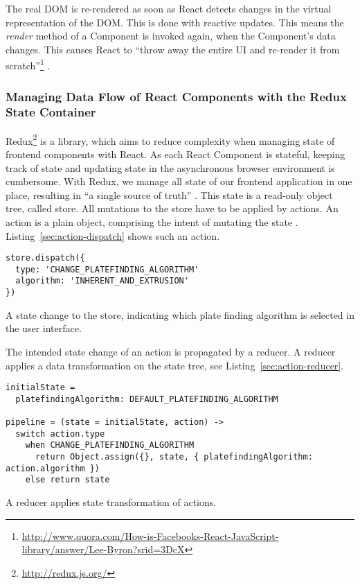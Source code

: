 \documentclass[../../ClassicThesis.tex]{subfiles}
\begin{document}
The real DOM is re-rendered as soon as React detects changes in the
virtual representation of the DOM. This is done with reactive updates.
This means the \textit{render} method of a Component is invoked again,
when the Component's data changes. This causes React to \enquote{throw
  away the entire UI and re-render it from
  scratch}\footnote{\url{http://www.quora.com/How-is-Facebooks-React-JavaScript-library/answer/Lee-Byron?srid=3DcX}}
\cite{React13}.


\subsubsection{Managing Data Flow of React Components with the Redux
  State Container}
\label{sec:flow-with-redux}

Redux\footnote{\url{http://redux.js.org/}} is a {\javascript} library,
which aims to reduce complexity when managing state of frontend
components with React. As each React Component is stateful, keeping
track of state and updating state in the asynchronous browser
environment is cumbersome. With Redux, we manage all state of our
frontend application in one place, resulting in \enquote{a single
  source of truth} \cite{redux}. This state is a read-only object
tree, called store. All mutations to the store have to be applied by
actions. An action is a plain object, comprising the intent of
mutating the state \cite{redux}. Listing~\ref{sec:action-dispatch}
shows such an action.

\begin{listing}[h]
\begin{verbatim}
store.dispatch({
  type: 'CHANGE_PLATEFINDING_ALGORITHM'
  algorithm: 'INHERENT_AND_EXTRUSION'
})
\end{verbatim}
\caption{A state change to the store, indicating which plate finding
  algorithm is selected in the user interface.}
\label{lst:action-dispatch}
\end{listing}

The intended state change of an action is propagated by a
reducer. A reducer applies a data transformation on the state tree,
see Listing~\ref{sec:action-reducer}.

\begin{listing}[h]
\begin{verbatim}
initialState =
  platefindingAlgorithm: DEFAULT_PLATEFINDING_ALGORITHM

pipeline = (state = initialState, action) ->
  switch action.type
    when CHANGE_PLATEFINDING_ALGORITHM
      return Object.assign({}, state, { platefindingAlgorithm: action.algorithm })
    else return state
\end{verbatim}
\caption{A reducer applies state transformation of actions.}
\label{lst:action-reducer}
\end{listing}
\end{document}

